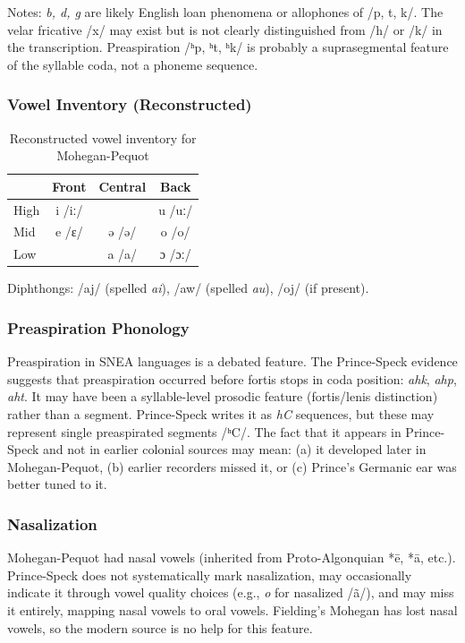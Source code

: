 Notes: \textit{b, d, g} are likely English loan phenomena or allophones of
/p, t, k/. The velar fricative /x/ may exist but is not clearly distinguished
from /h/ or /k/ in the transcription. Preaspiration /ʰp, ʰt, ʰk/ is probably
a suprasegmental feature of the syllable coda, not a phoneme sequence.

\subsubsection{Vowel Inventory (Reconstructed)}

\begin{table}[h]
\centering
\begin{tabular}{lccc}
\toprule
 & Front & Central & Back \\
\midrule
High & i /iː/ & & u /uː/ \\
Mid & e /ɛ/ & ə /ə/ & o /o/ \\
Low & & a /a/ & ɔ /ɔː/ \\
\bottomrule
\end{tabular}
\caption{Reconstructed vowel inventory for Mohegan-Pequot}
\label{tab:1368-vowels}
\end{table}

Diphthongs: /aj/ (spelled \textit{ai}), /aw/ (spelled \textit{au}), /oj/
(if present).

\subsubsection{Preaspiration Phonology}

Preaspiration in SNEA languages is a debated feature. The Prince-Speck
evidence suggests that preaspiration occurred before fortis stops in coda
position: \textit{ahk}, \textit{ahp}, \textit{aht}. It may have been a
syllable-level prosodic feature (fortis/lenis distinction) rather than a
segment. Prince-Speck writes it as \textit{hC} sequences, but these may
represent single preaspirated segments /ʰC/. The fact that it appears in
Prince-Speck and not in earlier colonial sources may mean: (a) it developed
later in Mohegan-Pequot, (b) earlier recorders missed it, or (c) Prince's
Germanic ear was better tuned to it.

\subsubsection{Nasalization}

Mohegan-Pequot had nasal vowels (inherited from Proto-Algonquian *ē, *ā,
etc.). Prince-Speck does not systematically mark nasalization, may
occasionally indicate it through vowel quality choices (e.g., \textit{o} for
nasalized /ã/), and may miss it entirely, mapping nasal vowels to oral
vowels. Fielding's Mohegan has lost nasal vowels, so the modern source is no
help for this feature.

